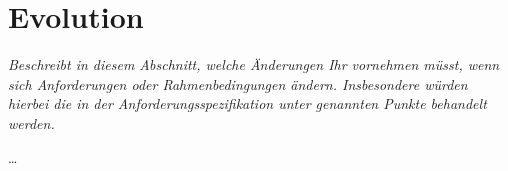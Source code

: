 \documentclass[fontsize=12pt,paper=a4,twoside]{scrartcl}
\begin{document}
\section{Evolution} \label{sec:evolution}
\nurlangversion

{ \em Beschreibt in diesem Abschnitt, welche Änderungen Ihr vornehmen
  müsst, wenn sich Anforderungen oder Rahmenbedingungen ändern. 
  Insbesondere würden hierbei die in der Anforderungsspezifikation 
  unter  genannten Punkte behandelt werden.
}

\dots
\end{document}
